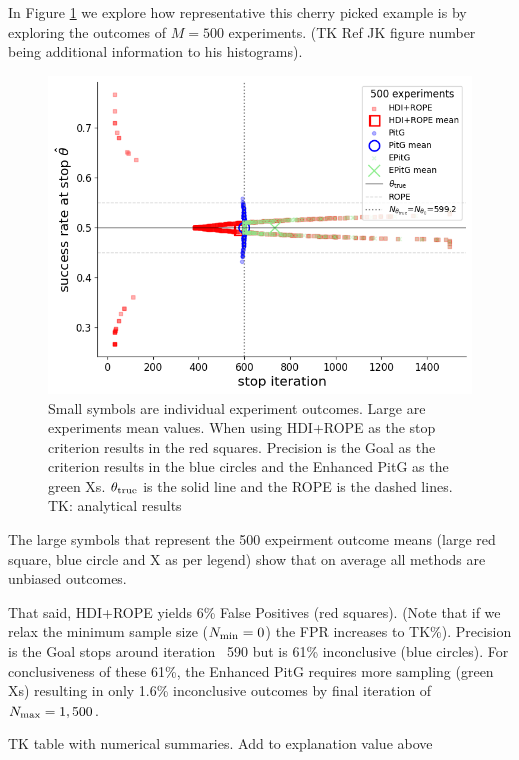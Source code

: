 \documentclass{article}
\begin{document}
In Figure \ref{fig:fair_iter_vs_rate} we explore how representative this cherry picked example is by exploring
the outcomes of $M=500$ experiments. (TK Ref JK figure number being additional information to his histograms).

\begin{figure}[h!]
  \centering
  \includegraphics[width=1\textwidth]{fair_experiments_iter_vs_rate.png}
  \caption{Small symbols are individual experiment outcomes. Large are experiments
  mean values. When using HDI+ROPE as the stop criterion results in the red squares.
  Precision is the Goal as the criterion results in the blue circles
  and the Enhanced PitG as the green Xs. $\theta_{\rm true}$ is the solid line and
  the ROPE is the dashed lines. TK: analytical results
  }
  \label{fig:fair_iter_vs_rate}
\end{figure}

The large symbols that represent the 500 expeirment outcome means 
(large red square, blue circle and X as per legend) show
that on average all methods are unbiased outcomes.

That said, HDI+ROPE yields 6\% False Positives (red squares).
(Note that if we relax the minimum sample size ($N_{\rm min}=0$) the FPR increases to TK\%).
Precision is the Goal stops around iteration ~590 but is 61\% inconclusive (blue circles).
For conclusiveness of these 61\%, the Enhanced PitG requires more sampling (green Xs)
resulting in only 1.6\% inconclusive outcomes by final iteration of $N_{\rm max}=1,500$.

TK table with numerical summaries. Add to explanation value above
\end{document}
